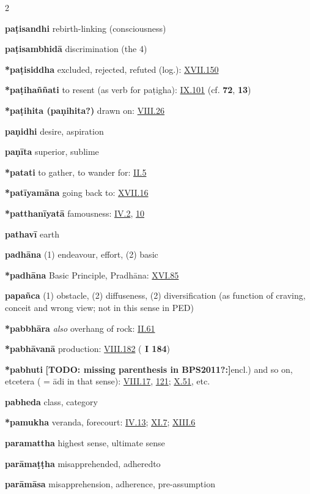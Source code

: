 \begin{multicols}{2}
\begin{vismHanging}
\par\textbf{paṭisandhi} rebirth-linking (consciousness) 
\par\textbf{paṭisambhidā} discrimination (the 4)
\par\textbf{*paṭisiddha} excluded, rejected, refuted (log.): \hyperlink{XVII.150}{XVII.150}{} 
\par\textbf{*paṭihaññati} to resent (as verb for paṭigha): \hyperlink{IX.101}{IX.101}{} (cf. \textbf{\cite{Dhs-a} 72}, \textbf{\cite{Netti} 13})
\par\textbf{*paṭihita (paṇihita?)} drawn on: \hyperlink{VIII.26}{VIII.26}{}
\par\textbf{paṇidhi} desire, aspiration
\par\textbf{paṇīta} superior, sublime
\par\textbf{*patati} to gather, to wander for: \hyperlink{II.5}{II.5}{}
\par\textbf{*patīyamāna} going back to: \hyperlink{XVII.16}{XVII.16}{}
\par\textbf{*patthanīyatā} famousness: \hyperlink{IV.2}{IV.2}{}, \hyperlink{IV.10}{10}{}
\par\textbf{pathavī} earth
\par\textbf{padhāna} (1) endeavour, effort, (2) basic
\par\textbf{*padhāna} Basic Principle, Pradhāna: \hyperlink{XVI.85}{XVI.85}{} 
\par\textbf{papañca} (1) obstacle, (2) diffuseness, (2) diversification (as function of craving, conceit and wrong view; not in this sense in PED) 
\par\textbf{*pabbhāra} \emph{also }overhang of rock: \hyperlink{II.61}{II.61}{}
\par\textbf{*pabhāvanā} production: \hyperlink{VIII.182}{VIII.182}{} (\textbf{\cite{Paṭis} I 184}) 
\par\textbf{*pabhuti} \textbf{[TODO: missing parenthesis in BPS2011?:]}encl.) and so on, etcetera ( = ādi in that sense): \hyperlink{VIII.17}{VIII.17}{}, \hyperlink{VIII.121}{121}{}; \hyperlink{X.51}{X.51}{}, etc. 
\par\textbf{pabheda} class, category 
\par\textbf{*pamukha} veranda, forecourt: \hyperlink{IV.13}{IV.13}{}; \hyperlink{XI.7}{XI.7}{}; \hyperlink{XIII.6}{XIII.6}{} 
\par\textbf{paramattha} highest sense, ultimate sense 
\par\textbf{parāmaṭṭha} misapprehended, adheredto 
\par\textbf{parāmāsa} misapprehension, adherence, pre-assumption 

\end{vismHanging}
\end{multicols}
